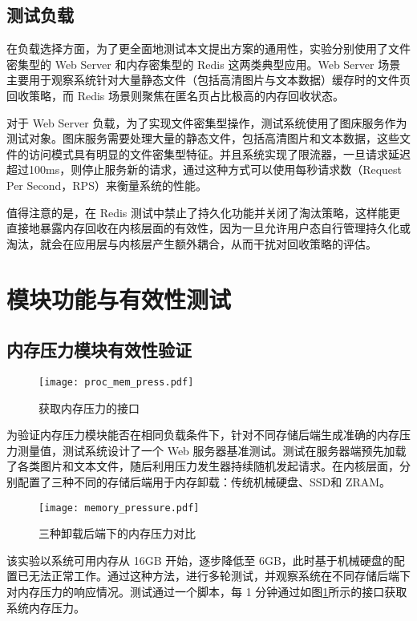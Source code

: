 \subsection{测试负载}

在负载选择方面，为了更全面地测试本文提出方案的通用性，实验分别使用了文件密集型的 Web Server 和内存密集型的 Redis 这两类典型应用。Web Server 场景主要用于观察系统针对大量静态文件（包括高清图片与文本数据）缓存时的文件页回收策略，而 Redis 场景则聚焦在匿名页占比极高的内存回收状态。

对于 Web Server 负载，为了实现文件密集型操作，测试系统使用了图床服务作为测试对象。图床服务需要处理大量的静态文件，包括高清图片和文本数据，这些文件的访问模式具有明显的文件密集型特征。并且系统实现了限流器，一旦请求延迟超过100ms，则停止服务新的请求，通过这种方式可以使用每秒请求数（Request Per Second，RPS）来衡量系统的性能。

值得注意的是，在 Redis 测试中禁止了持久化功能并关闭了淘汰策略，这样能更直接地暴露内存回收在内核层面的有效性，因为一旦允许用户态自行管理持久化或淘汰，就会在应用层与内核层产生额外耦合，从而干扰对回收策略的评估。

\section{模块功能与有效性测试}

\subsection{内存压力模块有效性验证}
\begin{figure}[htb]
    \centering
    \texttt{[image: proc\_mem\_press.pdf]}
    \caption{获取内存压力的接口}
    \label{fig:proc_mem_press}
\end{figure}

为验证内存压力模块能否在相同负载条件下，针对不同存储后端生成准确的内存压力测量值，测试系统设计了一个 Web 服务器基准测试。测试在服务器端预先加载了各类图片和文本文件，随后利用压力发生器持续随机发起请求。在内核层面，分别配置了三种不同的存储后端用于内存卸载：传统机械硬盘、SSD和 ZRAM。

\begin{figure}[htb]
    \centering
    \texttt{[image: memory\_pressure.pdf]}
    \caption{三种卸载后端下的内存压力对比}
    \label{fig:memory_pressure}
\end{figure}
该实验以系统可用内存从 16GB 开始，逐步降低至 6GB，此时基于机械硬盘的配置已无法正常工作。通过这种方法，进行多轮测试，并观察系统在不同存储后端下对内存压力的响应情况。测试通过一个脚本，每 1 分钟通过如图\ref{fig:proc_mem_press}所示的接口获取系统内存压力。

